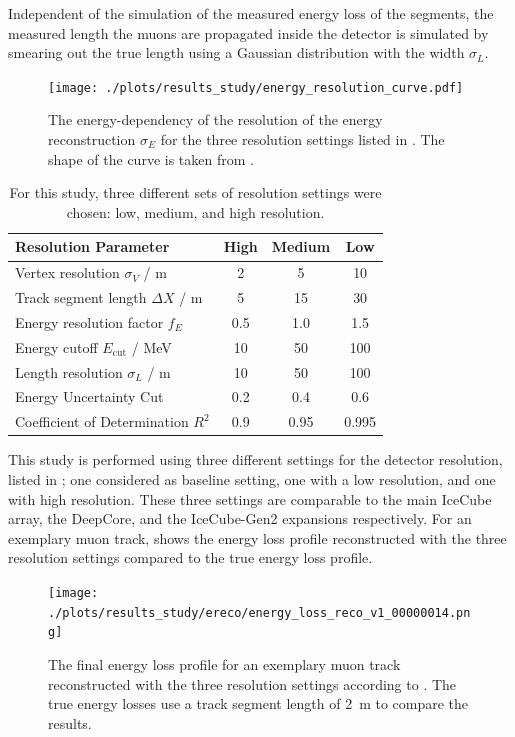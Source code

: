 Independent of the simulation of the measured energy loss of the segments, the measured length the muons are propagated inside the detector is simulated by smearing out the true length using a Gaussian distribution with the width $\sigma_L$.
\begin{figure}
    \centering
    \texttt{[image: ./plots/results\_study/energy\_resolution\_curve.pdf]}
    \caption{The energy-dependency of the resolution of the energy reconstruction $\sigma_E$ for the three resolution settings listed in . The shape of the curve is taken from \cite{IceCube2014Ereco}.}
    \label{fig:study_energy_resolution_curve}
\end{figure}
\begin{table}
    \centering
    \caption{For this study, three different sets of resolution settings
        were chosen: low, medium, and high resolution.}
    \label{tab:study_resolutions}
    \begin{tabular}{l | c c c}
        \toprule
        Resolution Parameter & High & Medium & Low \\
        \midrule
        Vertex resolution $\sigma_V$ / m & 2 & 5 & 10 \\
        Track segment length $\Delta X$ / m & 5 & 15 & 30 \\
        Energy resolution factor $f_E$ & 0.5 & 1.0 & 1.5 \\
        Energy cutoff $E_{\mathrm{cut}}$ / MeV & 10 & 50 & 100 \\
        Length resolution $\sigma_L$ / m & 10 & 50 & 100 \\
        \midrule
        Energy Uncertainty Cut & 0.2 & 0.4 & 0.6 \\
        Coefficient of Determination $R^2$ & 0.9 & 0.95 & 0.995 \\
        \bottomrule
    \end{tabular}
\end{table}

This study is performed using three different settings for the detector resolution, listed in ; one considered as baseline setting, one with a low resolution, and one with high resolution.
These three settings are comparable to the main IceCube array, the DeepCore, and the IceCube-Gen2 expansions respectively.
For an exemplary muon track,  shows the energy loss profile reconstructed with the three resolution settings compared to the true energy loss profile.
\begin{figure}
    \centering
    \texttt{[image: ./plots/results\_study/ereco/energy\_loss\_reco\_v1\_00000014.png]}
    \caption{The final energy loss profile for an exemplary muon track reconstructed with the three resolution settings according to . The true energy losses use a track segment length of \SI{2}{m} to compare the results.}
    \label{fig:study_ereco_eloss_profile}
\end{figure}

